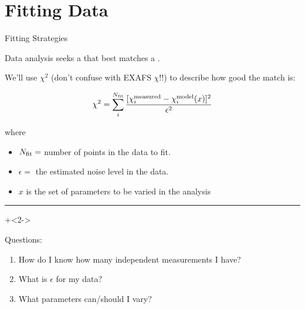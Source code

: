 \section{Fitting Data}

\begin{slide}{Fitting Strategies}

  Data analysis seeks a {} that best matches a
  {}.

  \vmm

  We'll use $\chi^2$ (don't confuse with EXAFS $\chi$!!) to describe how
  good the match is:

  \[ \chi^2  =
  \sum_i^{N_{\rm fit}} \frac{[\chi_i^{\rm measured} - \chi_i^{\rm
      model}({x})]^2}{\epsilon^2}
  \]

  where
  \begin{itemize}
  \item $N_{\rm fit} = $ number of points in the data to fit.
  \item $\epsilon = $ the  estimated noise  level in the data.
  \item $x$  is the set of parameters to be varied in the analysis
  \end{itemize}

  \begin{center}
    {}
  \end{center}

  \vmm   \hrule \vmm

  \onslide+<2->

  Questions:

  \begin{enumerate}
  \item How do I know how many independent measurements I have?
  \item What is $\epsilon$ for my data?
  \item What parameters can/should I vary?
  \end{enumerate}

\end{slide}

